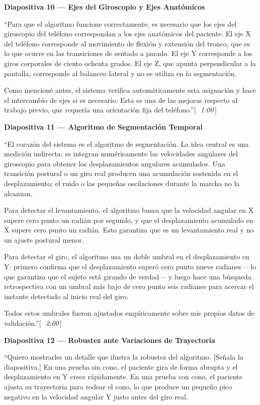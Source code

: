 \documentclass[12pt]{article}
\newcommand{\diap}[2]{%
  \begin{slidebox}
    \textbf{\color{slateblue}Diapositiva #1 — #2}
  \end{slidebox}%
}
\newcommand{\tiempo}[1]{\hfill{\small\color{timebox}[\,\textit{~#1}\,]}}
\begin{document}
\diap{10}{Ejes del Giroscopio y Ejes Anatómicos}

``Para que el algoritmo funcione correctamente, es necesario que los ejes del giroscopio del teléfono correspondan a los ejes anatómicos del paciente. El eje X del teléfono corresponde al movimiento de flexión y extensión del tronco, que es lo que ocurre en las transiciones de sentado a parado. El eje Y corresponde a los giros corporales de ciento ochenta grados. El eje Z, que apunta perpendicular a la pantalla, corresponde al balanceo lateral y no se utiliza en la segmentación.

Como mencioné antes, el sistema verifica automáticamente esta asignación y hace el intercambio de ejes si es necesario. Esta es una de las mejoras respecto al trabajo previo, que requería una orientación fija del teléfono.''\tiempo{1:00}

\diap{11}{Algoritmo de Segmentación Temporal}

``El corazón del sistema es el algoritmo de segmentación. La idea central es una medición indirecta: se integran numéricamente las velocidades angulares del giroscopio para obtener los desplazamientos angulares acumulados. Una transición postural o un giro real producen una acumulación sostenida en el desplazamiento; el ruido o las pequeñas oscilaciones durante la marcha no la alcanzan.

Para detectar el levantamiento, el algoritmo busca que la velocidad angular en X supere cero punto un radián por segundo, y que el desplazamiento acumulado en X supere cero punto un radián. Esto garantiza que es un levantamiento real y no un ajuste postural menor.

Para detectar el giro, el algoritmo usa un doble umbral en el desplazamiento en Y: primero confirma que el desplazamiento superó cero punto nueve radianes —lo que garantiza que el sujeto está girando de verdad— y luego hace una búsqueda retrospectiva con un umbral más bajo de cero punto seis radianes para acercar el instante detectado al inicio real del giro.

Todos estos umbrales fueron ajustados empíricamente sobre mis propios datos de validación.''\tiempo{2:00}

\diap{12}{Robustez ante Variaciones de Trayectoria}

``Quiero mostrarles un detalle que ilustra la robustez del algoritmo. [Señala la diapositiva.] En una prueba sin cono, el paciente gira de forma abrupta y el desplazamiento en Y crece rápidamente. En una prueba con cono, el paciente ajusta su trayectoria para rodear el cono, lo que produce un pequeño pico negativo en la velocidad angular Y justo antes del giro real.
\end{document}
